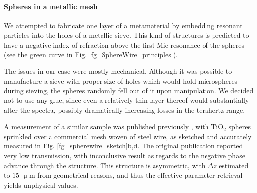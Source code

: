 \paragraph{Spheres in a metallic mesh} %
We attempted to fabricate one layer of a metamaterial by embedding resonant particles into the holes of a metallic sieve. This kind of structures is predicted to have a negative index of refraction above the first Mie resonance of the spheres (see the green curve in Fig. \ref{fg_SphereWire_principles}). 

The issues in our case were mostly mechanical. Although it was possible to manufacture a sieve with proper size of holes which would hold microspheres during sieving, the spheres randomly fell out of it upon manipulation. We decided not to use any glue, since even a relatively thin layer thereof would substantially alter the spectra, possibly dramatically increasing losses in the terahertz range.

A measurement of a similar sample was published previously \cite{yakiyama2012terahertz}, with TiO$_{2}$ spheres sprinkled over a commercial mesh woven of steel wire, as sketched and accurately measured in Fig. \ref{fg_spherewire_sketch}b,d. The original publication reported very low transmission, with inconclusive result as regards to the negative phase advance through the structure. This structure is asymmetric, with $\Delta z$ estimated to $15$ $\upmu$m from geometrical reasons, and thus the effective parameter retrieval yields unphysical values.

%    
%   


